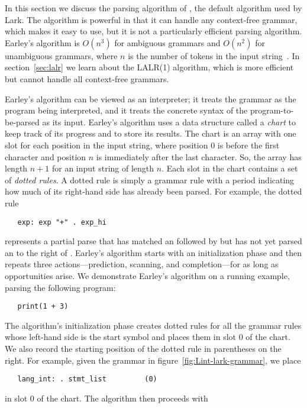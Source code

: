 \documentclass[7x10]{TimesAPriori_MIT}%
\numberwithin{theorem}{chapter}
\numberwithin{definition}{chapter}
\numberwithin{equation}{chapter}
\begin{document}
{In this section we discuss the parsing algorithm of
\citet{Earley:1970ly}, the default algorithm used by Lark.  The
algorithm is powerful in that it can handle any context-free grammar,
which makes it easy to use, but it is not a particularly
efficient parsing algorithm. Earley's algorithm is $O(n^3)$ for
ambiguous grammars and $O(n^2)$ for unambiguous grammars, where $n$ is
the number of tokens in the input
string~\citep{Hopcroft06:_automata}. In section~\ref{sec:lalr} we
learn about the LALR(1) algorithm, which is more efficient but cannot
handle all context-free grammars.

Earley's algorithm can be viewed as an interpreter; it treats the
grammar as the program being interpreted, and it treats the concrete
syntax of the program-to-be-parsed as its input.  Earley's algorithm
uses a data structure called a \emph{chart} to
keep track of its progress and to store its results. The chart is an
array with one slot for each position in the input string, where
position $0$ is before the first character and position $n$ is
immediately after the last character. So, the array has length $n+1$
for an input string of length $n$. Each slot in the chart contains a
set of \emph{dotted rules}. A dotted rule is simply a grammar rule
with a period indicating how much of its right-hand side has already
been parsed. For example, the dotted rule
\begin{lstlisting}
   exp: exp "+" . exp_hi
\end{lstlisting}
represents a partial parse that has matched an  followed by
\code{+} but has not yet parsed an  to the right of
\code{+}.
%
Earley's algorithm starts with an initialization phase and then
repeats three actions---prediction, scanning, and completion---for as
long as opportunities arise. We demonstrate Earley's algorithm on a
running example, parsing the following program:
\begin{lstlisting}
   print(1 + 3)
\end{lstlisting}
The algorithm's initialization phase creates dotted rules for all the
grammar rules whose left-hand side is the start symbol and places them
in slot $0$ of the chart. We also record the starting position of the
dotted rule in parentheses on the right. For example, given the
grammar in figure~\ref{fig:Lint-lark-grammar}, we place
\begin{lstlisting}
   lang_int: . stmt_list         (0)
\end{lstlisting}
in slot $0$ of the chart. The algorithm then proceeds with
}
\end{document}
